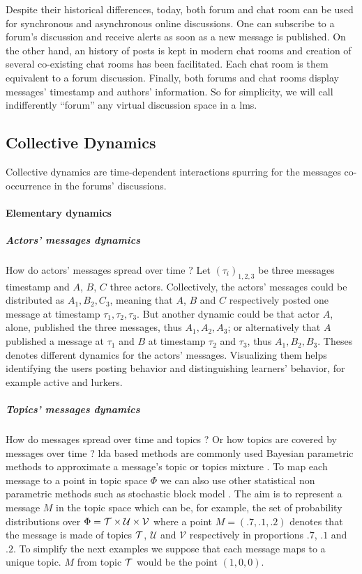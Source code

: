 \documentclass[a4paper,twoside]{article}
\newcommand{\V}{\mathcal{V}}
\newcommand{\U}{\mathcal{U}}
\begin{document}
Despite their historical differences, today, both forum and chat room can be used for synchronous and asynchronous online discussions.  One can subscribe to a forum's discussion and receive alerts as soon as a new message is published.  On the other hand, an history of posts is kept in modern chat rooms and creation of several co-existing chat rooms has been facilitated.  Each chat room is them equivalent to a forum discussion. Finally, both forums and chat rooms display messages' timestamp and authors' information.
So for simplicity, we will call indifferently ``forum'' any virtual discussion space in a \gls{lms}.

\subsection{Collective Dynamics}

Collective dynamics are time-dependent interactions spurring for the messages co-occurrence in the forums' discussions.

\paragraph{Elementary dynamics}

\subparagraph{Actors' messages dynamics}
How do actors' messages spread over time ?  Let $(\tau_i)_{1, 2, 3}$ be three messages timestamp and $A$, $B$, $C$ three actors.  Collectively, the actors' messages could be distributed as $A_1, B_2,C_3$, meaning that $A$, $B$  and $C$ respectively posted one message at timestamp $\tau_1, \tau_2, \tau_3$.  But another dynamic could be that actor $A$, alone, published the three messages, thus $A_1, A_2, A_3$; or alternatively that $A$ published a message at $\tau_1$ and $B$ at timestamp $\tau_2$ and $\tau_3$, thus $A_1, B_2, B_3$.  Theses denotes different dynamics for the actors' messages.  Visualizing them helps identifying the users posting behavior and distinguishing learners' behavior, for example active and lurkers.


\subparagraph{Topics' messages dynamics}
How do messages spread over time and topics ?  Or how topics are covered by messages over time ?
\gls{lda} based methods are commonly used Bayesian parametric methods to approximate a message's topic or topics mixture \citep{Jelodar2017}.  To map each message to a point in topic space $\Phi$ we can also use other statistical non parametric methods such as stochastic block model \citep{Gerlach2018}.   The aim is to represent a message $M$ in the topic space which can be, for example, the set of probability distributions over $\Phi = \T\times \U \times \V$ where a point $M = (.7, .1, .2)$ denotes that the message is made of topics $\mathcal{T}$, $\U$ and $\V$ respectively in proportions $.7$, $.1$ and $.2$.  To simplify the next examples we suppose that each message maps to a unique topic. $M$ from topic $\mathcal{T}$ would be the point $(1, 0, 0)$.
\end{document}
